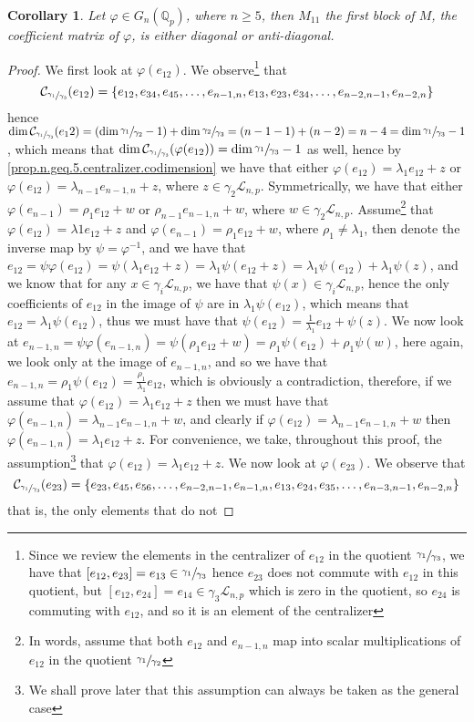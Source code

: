 \documentclass[12pt]{article}
\newtheorem{corollary}[theorem]{Corollary}
\begin{document}
\begin{corollary}
Let $\varphi\in G_n(\mathbb{Q}_p)$, where $n\geq 5$, then $M_{11}$ the first block of $M$, the coefficient matrix of $\varphi$, is either diagonal or anti-diagonal.
\end{corollary}
\begin{proof}
We first look at $\varphi(e_{12})$. We observe\footnote{Since we review the elements in the centralizer of $e_{12}$ in the quotient $\sfrac{\gamma_1}{\gamma_3}$, we have that $[e_{12},e_{23}]=e_{13}\in\sfrac{\gamma_1}{\gamma_3}$ hence $e_{23}$ does not commute with $e_{12}$ in this quotient, but $[e_{12},e_{24}]=e_{14}\in\gamma_3\mathcal{L}_{n,p}$ which is zero in the quotient, so $e_{24}$ is commuting with $e_{12}$, and so it is an element of the centralizer} that \[\mathcal{C}_{\sfrac{\gamma_1}{\gamma_3}}(e_{12})=\{e_{12},e_{34},e_{45},\dots,e_{n-1,n},e_{13},e_{23},e_{34},\dots,e_{n-2,n-1},e_{n-2,n}\}\] hence $\dim\mathcal{C}_{\sfrac{\gamma_1}{\gamma_3}}(e_12)=(\dim\sfrac{\gamma_1}{\gamma_2}-1)+\dim\sfrac{\gamma_2}{\gamma_3}=(n-1-1)+(n-2)=n-4=\dim\sfrac{\gamma_1}{\gamma_3}-1$, which means that $\dim\mathcal{C}_{\sfrac{\gamma_1}{\gamma_3}}(\varphi(e_{12}))=\dim\sfrac{\gamma_1}{\gamma_3}-1$ as well, hence by \ref{prop.n.geq.5.centralizer.codimension} we have that either  $\varphi(e_{12})=\lambda_1 e_{12}+z$ or $\varphi(e_{12})=\lambda_{n-1}e_{n-1,n}+z$, where $z\in\gamma_2\mathcal{L}_{n,p}$. Symmetrically, we have that either $\varphi(e_{n-1})=\rho_1 e_{12}+w$ or $\rho_{n-1}e_{n-1,n}+w$, where $w\in\gamma_2\mathcal{L}_{n,p}$. Assume\footnote{In words, assume that both $e_{12}$ and $e_{n-1,n}$ map into scalar multiplications of $e_{12}$ in the quotient $\sfrac{\gamma_1}{\gamma_2}$} that $\varphi(e_{12})=\lambda1 e_{12}+z$ and $\varphi(e_{n-1})=\rho_1 e_{12}+w$, where $\rho_1\neq\lambda_1$, then denote the inverse map by $\psi=\varphi^{-1}$, and we have that $e_{12}=\psi\varphi(e_{12})=\psi(\lambda_1 e_{12}+z)=\lambda_1\psi(e_{12}+z)=\lambda_1\psi(e_{12})+\lambda_1\psi(z)$, and we know that for any $x\in\gamma_i\mathcal{L}_{n,p}$, we have that $\psi(x)\in\gamma_i\mathcal{L}_{n,p}$, hence the only coefficients of $e_{12}$ in the image of $\psi$ are in $\lambda_1\psi(e_{12})$, which means that $e_{12}=\lambda_1\psi(e_{12})$, thus we must have that $\psi(e_{12})=\frac{1}{\lambda_1}e_{12}+\psi(z)$. We now look at $e_{n-1,n}=\psi\varphi(e_{n-1,n})=\psi(\rho_1 e_{12}+w)=\rho_1\psi(e_{12})+\rho_1\psi(w)$, here again, we look only at the image of $e_{n-1,n}$, and so we have that $e_{n-1,n}=\rho_1\psi(e_{12})=\frac{\rho_1}{\lambda_1}e_{12}$, which is obviously a contradiction, therefore, if we assume that $\varphi(e_{12})=\lambda_1 e_{12}+z$ then we must have that $\varphi(e_{n-1,n})=\lambda_{n-1}e_{n-1,n}+w$, and clearly if $\varphi(e_{12})=\lambda_{n-1}e_{n-1,n}+w$ then $\varphi(e_{n-1,n})=\lambda_1 e_{12}+z$. For convenience, we take, throughout this proof, the assumption\footnote{We shall prove later that this assumption can always be taken as the general case} that $\varphi(e_{12})=\lambda_1 e_{12}+z$. We now look at $\varphi(e_{23})$. We observe that \[\mathcal{C}_{\sfrac{\gamma_1}{\gamma_3}}(e_{23})=\{e_{23},e_{45},e_{56},\dots,e_{n-2,n-1},e_{n-1,n},e_{13},e_{24},e_{35},\dots,e_{n-3,n-1},e_{n-2,n}\}\] that is, the only elements that do not 
\end{proof}
\end{document}
